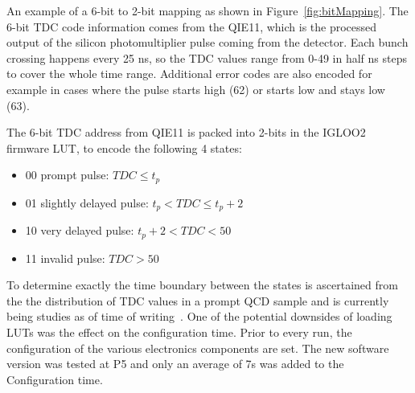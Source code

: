 
An example of a 6-bit to 2-bit mapping as shown in Figure~\ref{fig:bitMapping}. The 6-bit TDC code information comes from the QIE11, which is the processed output of the silicon photomultiplier pulse coming from the detector. Each bunch crossing happens every 25 ns, so the TDC values range from 0-49 in half ns steps to cover the whole time range. Additional error codes are also encoded for example in cases where the pulse starts high (62) or starts low and stays low 
(63).

The 6-bit TDC address from QIE11 is packed into 2-bits in the IGLOO2 firmware LUT, to encode the
following 4 states:

\begin{itemize}
  \item 00 prompt pulse:    $ TDC \leq t_{p}$
  \item 01 slightly delayed pulse: $ t_{p} < TDC \leq t_{p} +2$
  \item 10 very delayed pulse:  $ t_{p} +2 < TDC < 50$
  \item 11 invalid pulse: $ TDC > 50$
\end{itemize}

To determine exactly the time boundary between the states is ascertained from the the distribution of TDC values in a prompt QCD sample and is currently being studies as of time of writing~\cite{HBTDCLUT_uHTR}. One of the potential downsides of loading LUTs was the effect on the configuration time. Prior to every run, the configuration of the various electronics components are set. The new software version was tested at P5 and only an average of 7s was added to the Configuration time. 



